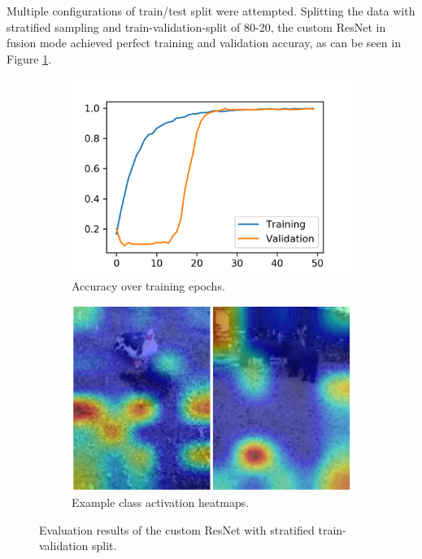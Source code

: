 \documentclass{l4proj}
\begin{document}
Multiple configurations of train/test split were attempted. Splitting the data with stratified sampling and train-validation-split of 80-20, the custom ResNet in fusion mode achieved perfect training and validation accuray, as can be seen in Figure \ref{fig:acc_stratified}.  

\begin{figure}[ht]
  \centering
  \begin{subfigure}[h!]{0.42\textwidth}
    \includegraphics[width=\textwidth, trim={0cm 0cm 0cm 0.7cm}, clip=true]{images/evaluation/stratified/accuracy.png}
    \caption{Accuracy over training epochs.}
    \label{fig:acc_stratified}
  \end{subfigure}
  \begin{subfigure}[h!]{0.4\textwidth}
    \includegraphics[width=\textwidth]{images/evaluation/stratified/heatmaps.png}
    \caption{Example class activation heatmaps.}
    \label{fig:heatmap_stratified}
  \end{subfigure}
  \caption{Evaluation results of the custom ResNet with stratified train-validation split.}
\end{figure}
\end{document}
